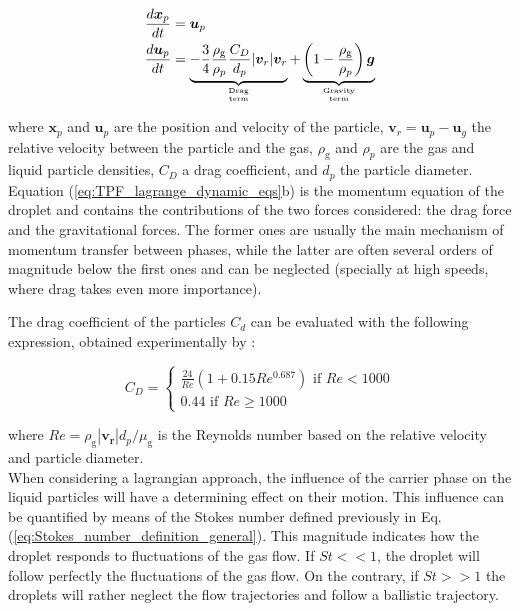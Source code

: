 \begin{subequations}
\label{eq:TPF_lagrange_dynamic_eqs}
\begin{align}
\frac{d \boldsymbol{x}_p}{d t} &= \boldsymbol{u}_p \\
\frac{d \boldsymbol{u}_p}{d t} &= \underbrace{ - \frac{3}{4} \frac{\rho_\mathrm{g}}{\rho_p} \frac{C_D}{d_p} | \boldsymbol{v}_r | \boldsymbol{v}_r }_{\text{Drag}\atop\text{term}}  + \underbrace{ \left( 1 - \frac{\rho_\mathrm{g}}{\rho_p} \right) \boldsymbol{g} }_{\text{Gravity}\atop\text{term}} 
\end{align}
\end{subequations}

where $\textbf{x}_p$ and $\textbf{u}_p$ are the position and velocity of the particle, $\textbf{v}_r = \boldsymbol{u}_p  - \boldsymbol{u}_g$ the relative velocity between the particle and the gas, $\rho_\mathrm{g}$ and $\rho_p$ are the gas and liquid particle densities, $C_D$ a drag coefficient, and $d_p$ the particle diameter. Equation (\ref{eq:TPF_lagrange_dynamic_eqs}b) is the momentum equation of the droplet and contains the contributions of the two forces considered: the drag force and the gravitational forces. The former ones are usually the main mechanism of momentum transfer between phases, while the latter are often several orders of magnitude below the first ones and can be neglected (specially at high speeds, where drag takes even more importance). 

The drag coefficient of the particles $C_d$ can be evaluated with the following expression, obtained experimentally by :

\begin{equation}
\label{eq:Re_CD_droplet}
C_D =
\left\{
    \begin{split}
     \frac{24}{Re} \left( 1 + 0.15 Re^{0.687} \right)\,\,\mathrm{if}\,\,Re < 1000 \\ 
    0.44\,\,\mathrm{if}\,\,Re \geq 1000 
    \end{split}
\right.
\end{equation}

where $Re = \rho_\mathrm{g} | \boldsymbol{v_r} | d_p / \mu_\mathrm{g} $ is the Reynolds number based on the relative velocity and particle diameter. \\

When considering a lagrangian approach, the influence of the carrier phase on the liquid particles will have a determining effect on their motion. This influence can be quantified by means of the Stokes number defined previously in Eq. (\ref{eq:Stokes_number_definition_general}). This magnitude indicates how the droplet responds to fluctuations of the gas flow. If $St << 1$, the droplet will follow perfectly the fluctuations of the gas flow. On the contrary, if $St >> 1$ the droplets will rather neglect the flow trajectories and follow a ballistic trajectory. 

